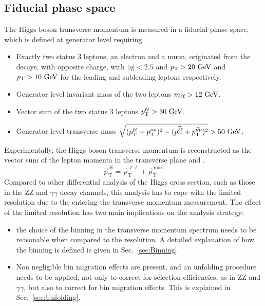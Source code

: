 \begin{itemize}
\subsection{Fiducial phase space}
The Higgs boson transverse momentum is measured in a fiducial phase space, which is defined at generator level requiring
\begin{itemize}
\item Exactly two status 3 leptons, an electron and a muon, originated from the \hwwllnn decays, with opposite charge, with $|\eta|<2.5$ and $p_\mathrm{T}>20~\mathrm{GeV}$ and $p_\mathrm{T}>10~\mathrm{GeV}$ for the leading and subleading leptons respectively.%
\item Generator level invariant mass of the two leptons $m_{\ell\ell}>12~\mathrm{GeV}$.
\item Vector sum of the two status 3 leptons $p_\mathrm{T}^{\ell\ell}>30~\mathrm{GeV}$.
\item Generator level transverse mass $\sqrt{(p_\mathrm{T}^{\ell\ell}+p_\mathrm{T}^{\nu\nu})^2 - (\vec{p_\mathrm{T}^{\ell\ell}}+\vec{p_\mathrm{T}^{\nu\nu}})^2}>50~\mathrm{GeV}$.
\end{itemize}

Experimentally, the Higgs boson transverse momentum is reconstructed as the vector sum of the lepton momenta in the transverse plane and \MET.
\begin{equation}
\vec{p}_\mathrm{T}^\mathrm{\,H} = \vec{p}_\mathrm{T}^{\,\ell\ell} + \vec{p}_\mathrm{T}^\mathrm{\,miss}
\end{equation}
Compared to other differential analysis of the Higgs cross section, such as those in the ZZ and $\gamma\gamma$ decay channels, this analysis has to cope with the limited resolution due to the \MET entering the transverse momentum measurement.
The effect of the limited \MET resolution has two main implications on the analysis strategy:
\begin{itemize}
\item the choice of the binning in the transverse momentum spectrum needs to be reasonable when compared to the resolution. A detailed explanation of how the binning is defined is given in Sec.~\ref{sec:Binning}.
\item Non negligible bin migration effects are present, and an unfolding procedure needs to be applied, not only to correct for selection efficiencies, as in ZZ and $\gamma\gamma$, but also to correct for bin migration effects. This is explained in Sec.~\ref{sec:Unfolding}.
\end{itemize}


\end{itemize}
